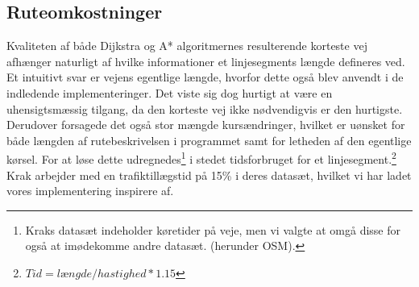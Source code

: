 \subsection{Ruteomkostninger}
\label{subsec:ruteomkostninger}
Kvaliteten af både Dijkstra og A* algoritmernes resulterende korteste vej afhænger naturligt af hvilke informationer et linjesegments længde defineres ved. Et intuitivt svar er vejens egentlige længde, hvorfor dette også blev anvendt i de indledende implementeringer. Det viste sig dog hurtigt at være en uhensigtsmæssig tilgang, da den korteste vej ikke nødvendigvis er den hurtigste. Derudover forsagede det også stor mængde kursændringer, hvilket er uønsket for både længden af rutebeskrivelsen i programmet samt for letheden af den egentlige kørsel. For at løse dette udregnedes\footnote{Kraks datasæt indeholder køretider på veje, men vi valgte at omgå disse for også at imødekomme andre datasæt. (herunder OSM).} i stedet tidsforbruget for et linjesegment.\footnote{$Tid=længde/hastighed*1.15$} Krak arbejder med en trafiktillægstid på 15\% i deres datasæt, hvilket vi har ladet vores implementering inspirere af.
